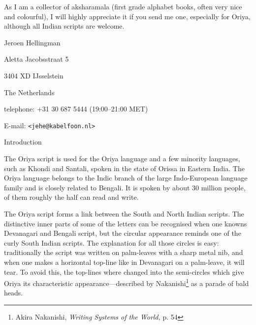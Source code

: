 As I am a collector of aksharamala (first grade alphabet books, often very
nice and colourful), I will highly appreciate it if you send me one, especially
for Oriya, although all Indian scripts are welcome.

% 
% 
% 

\bigskip

Jeroen Hellingman

Aletta Jacobsstraat 5

3404 XD IJsselstein

The Netherlands

telephone: +31 30 687 5444 (19:00--21:00 MET)

E-mail: {\tt<jehe@kabelfoon.nl>}

\vfill\eject


\beginsection Introduction

The Oriya script is used for the Oriya language and a few minority languages, 
such as Khondi and Santali, spoken
in the state of Orissa in Eastern India. The Oriya language belongs to the
Indic branch of the large Indo-European language family and is
closely related to Bengali. It is spoken by about 30 million people, of them
roughly the half can read and write.

The Oriya script forms a link between the South and North Indian scripts. The
distinctive inner parts of some of the letters can be recognised when one knowns
Devanagari and
Bengali script, but the circular appearance reminds one of the curly South Indian
scripts. The explanation for all those circles is easy: traditionally the
script was written on palm-leaves with a sharp metal nib, and when one makes a
horizontal top-line like in Devanagari on a palm-leave, it will tear. To
avoid this, the top-lines where changed into the semi-circles which give
Oriya its characteristic appearance---described by Nakanishi\footnote*{Akira
Nakanishi, {\it Writing Systems of the World,} p. 54} as a parade of bald heads.

